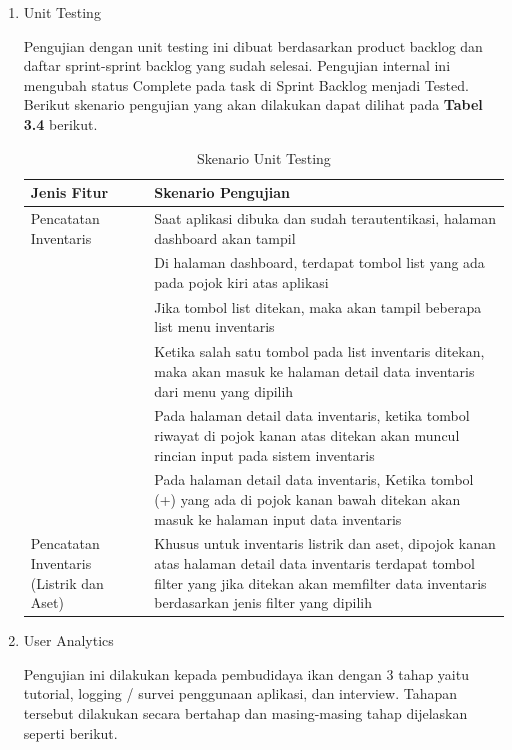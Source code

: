 \hfill \break

\begin{enumerate}
	\item Unit Testing
	
	Pengujian dengan unit testing ini dibuat berdasarkan product backlog dan daftar sprint-sprint backlog yang sudah selesai. Pengujian internal ini mengubah status Complete pada task di Sprint Backlog menjadi Tested. Berikut skenario pengujian yang akan dilakukan dapat dilihat pada \textbf{Tabel 3.4} berikut.

	\begin{table}[H]	
		\begin{center}
			\caption{Skenario Unit Testing}
			\label{tab:table8}
			\begin{tabular}{|m{13em}|m{17em}|}
			\hline
			\textbf{Jenis Fitur} & \textbf{Skenario Pengujian} \\
			\hline
			Pencatatan Inventaris & Saat aplikasi dibuka dan sudah terautentikasi, halaman dashboard akan tampil \\
			\hline
			 & Di halaman dashboard, terdapat tombol list yang ada pada pojok kiri atas aplikasi \\
			\hline
			 & Jika tombol list ditekan, maka akan tampil beberapa list menu inventaris \\
			\hline
			& Ketika salah satu tombol pada list inventaris ditekan, maka akan masuk ke halaman detail data inventaris dari menu yang dipilih \\
			\hline
			& Pada halaman detail data inventaris, ketika tombol riwayat di pojok kanan atas ditekan akan muncul rincian input pada sistem inventaris \\
			\hline
			& Pada halaman detail data inventaris, Ketika tombol (+) yang ada di pojok kanan bawah ditekan akan masuk ke halaman input data inventaris \\
			\hline
			Pencatatan Inventaris (Listrik dan Aset) & Khusus untuk inventaris listrik dan aset, dipojok kanan atas halaman detail data inventaris terdapat tombol filter yang jika ditekan akan memfilter data inventaris berdasarkan jenis filter yang dipilih  \\
			\hline
			\end{tabular}
		\end{center}
	\end{table}
	
	\item User Analytics
	
	Pengujian ini dilakukan kepada pembudidaya ikan dengan 3 tahap yaitu tutorial, logging / survei penggunaan aplikasi, dan interview. Tahapan tersebut dilakukan secara bertahap dan masing-masing tahap dijelaskan seperti berikut.


\end{enumerate}
